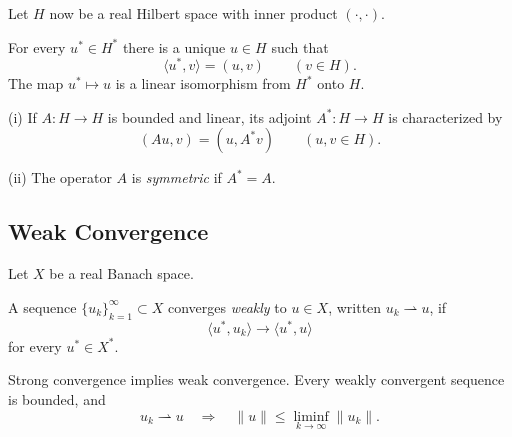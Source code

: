 Let $H$ now be a real Hilbert space with inner product $(\cdot,\cdot)$.

\begin{theorem}
\label{thm:riesz-representation-theorem}

For every $u^*\in H^*$ there is a unique $u\in H$ such that
\[
\langle u^*,v\rangle=(u,v)
\qquad(v\in H).
\]
The map $u^*\mapsto u$ is a linear isomorphism from $H^*$ onto $H$.
\end{theorem}

\begin{definition}
\label{def:adjoint-symmetric-operator}

(i) If $A:H\to H$ is bounded and linear, its adjoint $A^*:H\to H$ is characterized by
\[
(Au,v)=(u,A^*v)
\qquad(u,v\in H).
\]

(ii) The operator $A$ is \textit{symmetric} if $A^*=A$.
\end{definition}

\subsection{Weak Convergence}
\label{sec:weak-convergence-appendix-d}

Let $X$ be a real Banach space.

\begin{definition}
\label{def:weak-convergence}

A sequence $\{u_k\}_{k=1}^\infty\subset X$ converges \textit{weakly} to $u\in X$, written $u_k\rightharpoonup u$, if
\[
\langle u^*,u_k\rangle\to\langle u^*,u\rangle
\]
for every $u^*\in X^*$.
\end{definition}

\begin{remark}
\label{rem:weak-convergence-basic-properties}

Strong convergence implies weak convergence. Every weakly convergent sequence is bounded, and
\[
u_k\rightharpoonup u
\quad\Longrightarrow\quad
\|u\|\leq\liminf_{k\to\infty}\|u_k\|.
\]
\end{remark}


